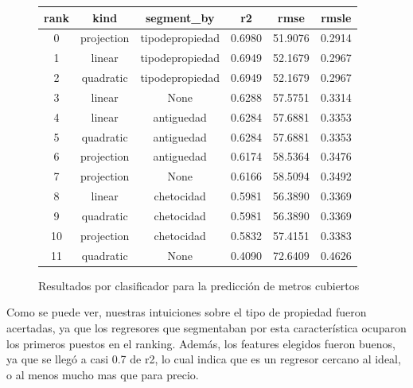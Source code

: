 \begin{figure}[H]
\centering
\begin{tabular}{ |c|c|c|c|c|c| } 
\hline
\textbf{rank}    & kind    & segment\_by  & r2    & rmse    & rmsle \\ \hline
0   & projection  & tipodepropiedad   & 0.6980 & 51.9076  & 0.2914 \\ \hline
1   & linear  & tipodepropiedad   & 0.6949 & 52.1679  & 0.2967 \\ \hline
2   & quadratic    & tipodepropiedad    & 0.6949  & 52.1679   & 0.2967 \\ \hline
3   & linear  & None  & 0.6288    & 57.5751 & 0.3314 \\ \hline
4   & linear  & antiguedad    & 0.6284  & 57.6881   & 0.3353 \\ \hline
5   & quadratic    & antiguedad & 0.6284   & 57.6881    & 0.3353 \\ \hline
6   & projection  & antiguedad    & 0.6174  & 58.5364   & 0.3476 \\ \hline
7   & projection  & None  & 0.6166    & 58.5094 & 0.3492 \\ \hline
8   & linear  & chetocidad    & 0.5981  & 56.3890   & 0.3369 \\ \hline
9   & quadratic    & chetocidad & 0.5981   & 56.3890    & 0.3369 \\ \hline
10  & projection    & chetocidad   & 0.5832 & 57.4151  & 0.3383 \\ \hline
11  & quadratic  & None  & 0.4090    & 72.6409 & 0.4626 \\ \hline
\end{tabular}
\caption{Resultados por clasificador para la predicción de metros cubiertos}
\label{table:results-m2}
\end{figure}

Como se puede ver, nuestras intuiciones sobre el tipo de propiedad fueron acertadas, ya que los regresores que segmentaban por esta característica ocuparon los primeros puestos en el ranking. Además, los features elegidos fueron buenos, ya que se llegó a casi 0.7 de r2, lo cual indica que es un regresor cercano al ideal, o al menos mucho mas que para precio.

